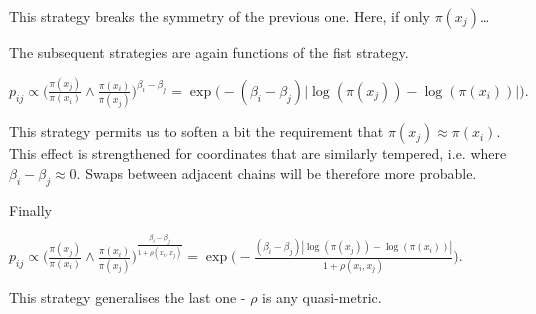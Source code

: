 This strategy breaks the symmetry of the previous one. Here, if only $\pi(x_j)$\dots 


The subsequent strategies are again functions of the fist strategy.

\begin{strategy}[resume]
	\item 
		$p_{ij} \propto 
			\Big( \frac{\pi (x_j)}{\pi( x_i )} \wedge 
			\frac{\pi (	x_i)}{\pi( x_j )} \Big)^{\beta_i - \beta_j} = 
		\exp \Big( - (\beta_i - \beta_j)\big| \log ( \pi(x_j) ) - \log ( \pi(x_i) ) \big| \Big).$ 
\end{strategy}

This strategy permits us to soften a bit the requirement that $\pi(x_j) \approx \pi (x_i)$. This effect is strengthened for coordinates that are similarly tempered, i.e. where $\beta_i - \beta_j \approx 0$. Swaps between adjacent chains will be therefore more probable. 

Finally

\begin{strategy}[resume]
	\item 
		$p_{ij} \propto \Big( \frac{\pi (x_j)}{\pi( x_i )} \wedge \frac{\pi (x_i)}{\pi( x_j )} \Big)^\frac{\beta_i - \beta_j}{1 + \rho(x_i, x_j)} = \exp \Big( - \frac{(\beta_i - \beta_j)| \log ( \pi(x_j) ) - \log ( \pi(x_i) ) |}{{1 + \rho(x_i, x_j)}} \Big).$
\end{strategy} 

This strategy generalises the last one - $\rho$ is any quasi-metric. 